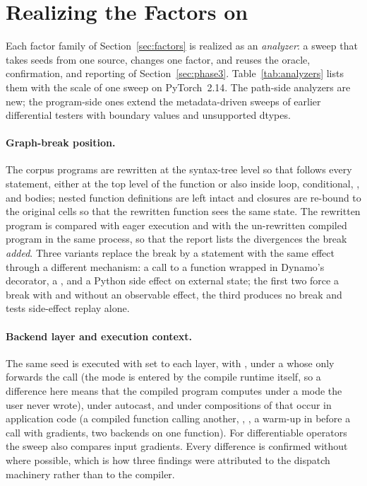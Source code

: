 \section{Realizing the Factors on \tcompile}
\label{sec:analyzers}

Each factor family of Section~\ref{sec:factors} is realized as an \emph{analyzer}: a sweep that takes seeds
from one source, changes one factor, and reuses the oracle, confirmation, and reporting of
Section~\ref{sec:phase3}. Table~\ref{tab:analyzers} lists them with the scale of one sweep on PyTorch~2.14.
The path-side analyzers are new; the program-side ones extend the metadata-driven sweeps of earlier
differential testers with boundary values and unsupported dtypes.



\paragraph{Graph-break position.} The corpus programs are rewritten at the syntax-tree level so that
 follows every statement, either at the top level of the function or also
inside loop, conditional, , and  bodies; nested function definitions are left intact and
closures are re-bound to the original cells so that the rewritten function sees the same state. The rewritten
program is compared with eager execution and with the un-rewritten compiled program in the same process, so
that the report lists the divergences the break \emph{added}. Three variants replace the break by a statement
with the same effect through a different mechanism: a call to a function wrapped in Dynamo's 
decorator, a , and a Python side effect on external state; the first two force a break with and without an
observable effect, the third produces no break and tests side-effect replay alone.

\paragraph{Backend layer and execution context.} The same seed is executed with  set to each layer,
with , under a  whose  only forwards
the call (the mode is entered by the compile runtime itself, so a difference here means that the compiled
program computes under a mode the user never wrote), under autocast, and under compositions of
\tcompile that occur in application code (a compiled function calling another, ,
, a warm-up in  before a call with gradients, two backends on one function).
For differentiable operators the sweep also compares input gradients. Every difference is confirmed without
\tcompile where possible, which is how three findings were attributed to the dispatch machinery rather than to
the compiler.

